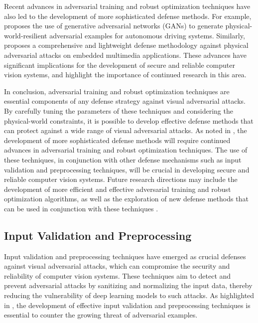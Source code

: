 \documentclass[11pt,a4paper]{article}
\begin{document}
Recent advances in adversarial training and robust optimization techniques have also led to the development of more sophisticated defense methods. For example, \cite{doi:10.1109/cvpr42600.2020.01426} proposes the use of generative adversarial networks (GANs) to generate physical-world-resilient adversarial examples for autonomous driving systems. Similarly, \cite{doi:10.1109/asp-dac47756.2020.9045584} proposes a comprehensive and lightweight defense methodology against physical adversarial attacks on embedded multimedia applications. These advances have significant implications for the development of secure and reliable computer vision systems, and highlight the importance of continued research in this area.

In conclusion, adversarial training and robust optimization techniques are essential components of any defense strategy against visual adversarial attacks. By carefully tuning the parameters of these techniques and considering the physical-world constraints, it is possible to develop effective defense methods that can protect against a wide range of visual adversarial attacks. As noted in \cite{doi:10.1109/access.2022.3208131}, the development of more sophisticated defense methods will require continued advances in adversarial training and robust optimization techniques. The use of these techniques, in conjunction with other defense mechanisms such as input validation and preprocessing techniques, will be crucial in developing secure and reliable computer vision systems. Future research directions may include the development of more efficient and effective adversarial training and robust optimization algorithms, as well as the exploration of new defense methods that can be used in conjunction with these techniques \cite{doi:10.1155/2021/4907754}.


\subsection{Input Validation and Preprocessing}


Input validation and preprocessing techniques have emerged as crucial defenses against visual adversarial attacks, which can compromise the security and reliability of computer vision systems. These techniques aim to detect and prevent adversarial attacks by sanitizing and normalizing the input data, thereby reducing the vulnerability of deep learning models to such attacks. As highlighted in \cite{doi:10.1145/3128572.3140444}, the development of effective input validation and preprocessing techniques is essential to counter the growing threat of adversarial examples.
\end{document}
